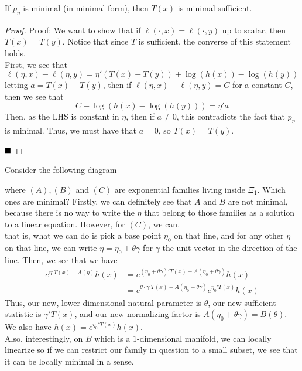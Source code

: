 \begin{lemma}
    If $p_{\eta}$ is minimal (in minimal form), then $T(x)$ is minimal sufficient.
\end{lemma}
\begin{proof}{Proof:}
    We want to show that if $\ell(\cdot, x) = \ell(\cdot, y)$ up to scalar, then $T(x) = T(y)$. Notice that since $T$ is sufficient, the converse of this statement holds.\\

    First, we see that
    \[ \ell(\eta, x) - \ell(\eta, y) = \eta'(T(x) - T(y)) + \log(h(x)) - \log(h(y)) \]
    letting $a = T(x) - T(y)$, then if $\ell(\eta, x) - \ell(\eta, y) = C$ for a constant $C$, then we see that
    \[ C - \log(h(x) - \log(h(y))) = \eta'a \]
    Then, as the LHS is constant in $\eta$, then if $a \ne 0$, this contradicts the fact that $p_{\eta}$ is minimal. Thus, we must have that $a = 0$, so $T(x) = T(y)$. 

    $\qed$
\end{proof}

Consider the following diagram

where $(A), (B)$ and $(C)$ are exponential families living inside $\Xi_{1}$. Which ones are minimal? Firstly, we can definitely see that $A$ and $B$ are not minimal, because there is no way to write the $\eta$ that belong to those families as a solution to a linear equation. However, for $(C)$, we can.\\

that is, what we can do is pick a base point $\eta_0$ on that line, and for any other $\eta$ on that line, we can write $\eta = \eta_0 + \theta \gamma$ for $\gamma$ the unit vector in the direction of the line. Then, we see that we have
\begin{align*}
    e^{\eta'T(x) - A(\eta)}h(x) &= e^{(\eta_0 + \theta \gamma)'T(x) - A(\eta_0 + \theta \gamma)}h(x)\\
    &= e^{\theta \cdot \gamma'T(x) - A(\eta_0 + \theta \gamma)}e^{\eta_0'T(x)}h(x)
\end{align*}
Thus, our new, lower dimensional natural parameter is $\theta$, our new sufficient statistic is $\gamma'T(x)$, and our new normalizing factor is $A(\eta_0 + \theta \gamma) = B(\theta)$. We also have $h(x) = e^{\eta_0'T(x)}h(x)$. \\

Also, interestingly, on $B$ which is a $1$-dimensional manifold, we can locally linearize so if we can restrict our family in question to a small subset, we see that it can be locally minimal in a sense. 

